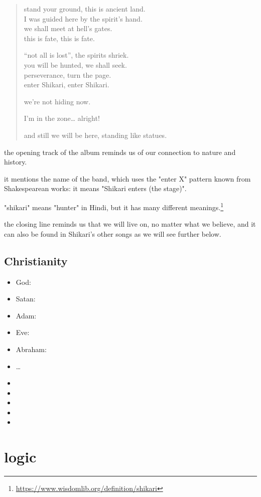 \documentclass[12pt]{report}
\theoremstyle{definition}
\theoremstyle{remark}
\begin{document}
\begin{quote}
stand your ground, this is ancient land.\\
I was guided here by the spirit's hand.\\
we shall meet at hell's gates.\\
this is fate, this is fate.

``not all is lost'', the spirits shriek.\\
you will be hunted, we shall seek.\\
perseverance, turn the page.\\
enter Shikari, enter Shikari.

we're not hiding now.

I'm in the zone… alright!

and still we will be here, standing like statues.\cite{album:es:ttts}
\end{quote}

the opening track of the album reminds us of our connection to nature and history.

it mentions the name of the band, which uses the "enter X" pattern known from Shakespearean works: it means "Shikari enters (the stage)".

"shikari" means "hunter" in Hindi, but it has many different meanings.\footnote{\url{https://www.wisdomlib.org/definition/shikari}}

the closing line reminds us that we will live on, no matter what we believe, and it can also be found in Shikari's other songs as we will see further below.

\subsection{Christianity}

\begin{itemize}
\item God: 
\item Satan: 
\item Adam: 
\item Eve: 
\item Abraham: 
\item …
\item 
\item 
\item 
\item 
\item 
\end{itemize}

\section{logic}
\end{document}
